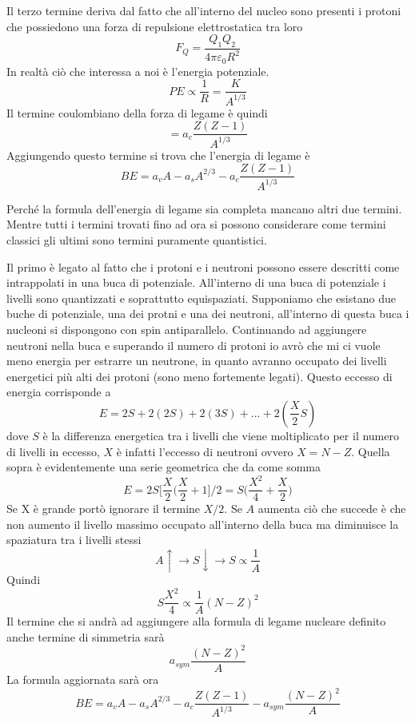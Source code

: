 Il terzo termine deriva dal fatto che all'interno del nucleo sono presenti i protoni che possiedono una forza di repulsione elettrostatica tra loro
\[
F_Q=\frac{Q_1Q_2}{4\pi \varepsilon_0 R^2}
\]
In realtà ciò che interessa a noi è l'energia potenziale.
\[
PE\propto \frac{1}{R}=\frac{K}{A^{1/3}}
\]
Il termine coulombiano della forza di legame è quindi
\begin{equation}
=a_c\frac{Z(Z-1)}{A^{1/3}}
\end{equation}
Aggiungendo questo termine si trova che l'energia di legame è
\begin{equation}
BE=a_vA-a_sA^{2/3}-a_c\frac{Z(Z-1)}{A^{1/3}}
\end{equation}

Perché la formula dell'energia di legame sia completa mancano altri due termini.
Mentre tutti i termini trovati fino ad ora si possono considerare come termini classici gli ultimi sono termini puramente quantistici. 

Il primo è legato al fatto che i protoni e i neutroni possono essere descritti come intrappolati in una buca di potenziale.
All'interno di una buca di potenziale i livelli sono quantizzati e soprattutto equispaziati.
Supponiamo che esistano due buche di potenziale, una dei protni e una dei neutroni, all'interno di questa buca i nucleoni si dispongono con spin antiparallelo.
Continuando ad aggiungere neutroni nella buca e superando il numero di protoni io avrò che mi ci vuole meno energia per estrarre un neutrone, in quanto avranno occupato dei livelli energetici più alti dei protoni (sono meno fortemente legati).
Questo eccesso di energia corrisponde a 
\begin{equation}
E= 2S+ 2(2S)+2(3S)+ ...+ 2(\frac{X}{2}S)
\end{equation}
dove $S$ è la differenza energetica tra i livelli che viene moltiplicato per il numero di livelli in eccesso, $X$ è infatti l'eccesso di neutroni ovvero $X=N-Z$.
Quella sopra è evidentemente una serie geometrica che da come somma
\begin{equation}
E=2S\biggl[\frac{X}{2}\biggl(\frac{X}{2}+1\biggl]/2=S\biggl(\frac{X^2}{4}+\frac{X}{2}\biggl)
\end{equation}
Se X è grande portò ignorare il termine $X/2$.
Se $A$ aumenta ciò che succede è che non  aumento il livello massimo occupato all'interno della buca ma diminuisce la spaziatura tra i livelli stessi
\begin{equation}
A\uparrow \rightarrow S\downarrow \rightarrow S\propto \frac{1}{A}
\end{equation}
Quindi 
\begin{equation}
S\frac{X^2}{4}\propto \frac{1}{A}(N-Z)^2
\end{equation}
Il termine che si andrà ad aggiungere alla formula di legame nucleare definito anche termine di simmetria sarà
\begin{equation}
a_{sym}\frac{(N-Z)^2}{A}
\end{equation}
La formula aggiornata sarà ora
\begin{equation}
BE=a_vA-a_sA^{2/3}-a_c\frac{Z(Z-1)}{A^{1/3}}-a_{sym}\frac{(N-Z)^2}{A}
\end{equation} 

